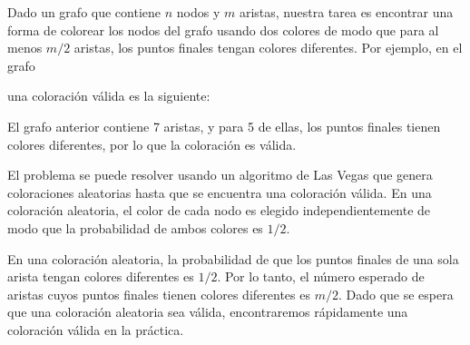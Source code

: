 Dado un grafo que contiene $n$ nodos y $m$ aristas,
nuestra tarea es encontrar una forma de colorear los nodos
del grafo usando dos colores de modo que
para al menos $m/2$ aristas, los puntos finales 
tengan colores diferentes.
Por ejemplo, en el grafo
\begin{center}
\end{center}
una coloración válida es la siguiente:
\begin{center}
\end{center}
El grafo anterior contiene 7 aristas, y para 5 de ellas,
los puntos finales tienen colores diferentes,
por lo que la coloración es válida.

El problema se puede resolver usando un algoritmo de Las Vegas
que genera coloraciones aleatorias hasta que se encuentra una coloración válida.
En una coloración aleatoria, el color de cada nodo es
elegido independientemente de modo que la probabilidad de
ambos colores es $1/2$.

En una coloración aleatoria, la probabilidad de que los puntos finales
de una sola arista tengan colores diferentes es $1/2$.
Por lo tanto, el número esperado de aristas cuyos puntos finales
tienen colores diferentes es $m/2$.
Dado que se espera que una coloración aleatoria sea válida,
encontraremos rápidamente una coloración válida en la práctica.
